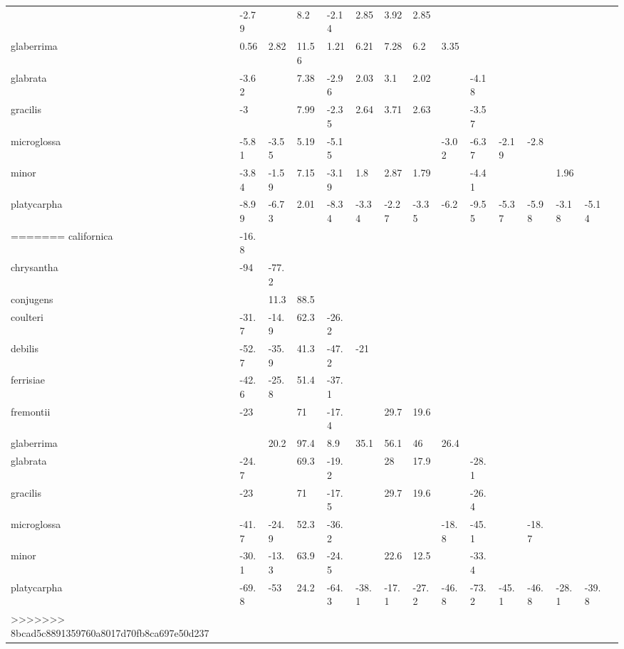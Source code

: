 \begin{table}[ht]
\begin{tabular}{lllllllllllllll}
\begin{table}[ht]
\begin{tabular}{lllllllllllllll}
\begin{table}[ht]
\begin{tabular}{lllllllllllllll}
\begin{table}[ht]
\begin{tabular}{lllllllllllllll}
\begin{table}[ht]
\begin{tabular}{lllllllllllllll}
\begin{table}[ht]
\begin{table}[ht]
\begin{tabular}{lllllllllllllll}
  fremontii & -2.79 &  & 8.2 & -2.14 & 2.85 & 3.92 & 2.85 &  &  &  &  &  &  &  \\ 
  glaberrima & 0.56 & 2.82 & 11.56 & 1.21 & 6.21 & 7.28 & 6.2 & 3.35 &  &  &  &  &  &  \\ 
  glabrata & -3.62 &  & 7.38 & -2.96 & 2.03 & 3.1 & 2.02 &  & -4.18 &  &  &  &  &  \\ 
  gracilis & -3 &  & 7.99 & -2.35 & 2.64 & 3.71 & 2.63 &  & -3.57 &  &  &  &  &  \\ 
  microglossa & -5.81 & -3.55 & 5.19 & -5.15 &  &  &  & -3.02 & -6.37 & -2.19 & -2.8 &  &  &  \\ 
  minor & -3.84 & -1.59 & 7.15 & -3.19 & 1.8 & 2.87 & 1.79 &  & -4.41 &  &  & 1.96 &  &  \\ 
  platycarpha & -8.99 & -6.73 & 2.01 & -8.34 & -3.34 & -2.27 & -3.35 & -6.2 & -9.55 & -5.37 & -5.98 & -3.18 & -5.14 &  \\ 
=======
  californica & -16.8 &  &  &  &  &  &  &  &  &  &  &  &  &  \\ 
  chrysantha & -94 & -77.2 &  &  &  &  &  &  &  &  &  &  &  &  \\ 
  conjugens &  & 11.3 & 88.5 &  &  &  &  &  &  &  &  &  &  &  \\ 
  coulteri & -31.7 & -14.9 & 62.3 & -26.2 &  &  &  &  &  &  &  &  &  &  \\ 
  debilis & -52.7 & -35.9 & 41.3 & -47.2 & -21 &  &  &  &  &  &  &  &  &  \\ 
  ferrisiae & -42.6 & -25.8 & 51.4 & -37.1 &  &  &  &  &  &  &  &  &  &  \\ 
  fremontii & -23 &  & 71 & -17.4 &  & 29.7 & 19.6 &  &  &  &  &  &  &  \\ 
  glaberrima &  & 20.2 & 97.4 & 8.9 & 35.1 & 56.1 & 46 & 26.4 &  &  &  &  &  &  \\ 
  glabrata & -24.7 &  & 69.3 & -19.2 &  & 28 & 17.9 &  & -28.1 &  &  &  &  &  \\ 
  gracilis & -23 &  & 71 & -17.5 &  & 29.7 & 19.6 &  & -26.4 &  &  &  &  &  \\ 
  microglossa & -41.7 & -24.9 & 52.3 & -36.2 &  &  &  & -18.8 & -45.1 &  & -18.7 &  &  &  \\ 
  minor & -30.1 & -13.3 & 63.9 & -24.5 &  & 22.6 & 12.5 &  & -33.4 &  &  &  &  &  \\ 
  platycarpha & -69.8 & -53 & 24.2 & -64.3 & -38.1 & -17.1 & -27.2 & -46.8 & -73.2 & -45.1 & -46.8 & -28.1 & -39.8 &  \\ 
>>>>>>> 8bcad5c8891359760a8017d70fb8ca697e50d237
   \hline
\end{tabular}
\end{table}
